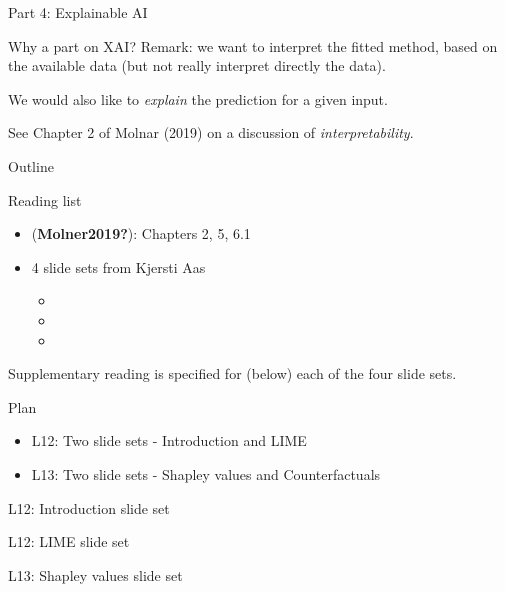 \documentclass[
  ignorenonframetext,
]{beamer}
\providecommand{\tightlist}{%
  \setlength{\itemsep}{0pt}\setlength{\parskip}{0pt}}
\begin{document}
\begin{frame}{Part 4: Explainable AI}
\begin{block}{Why a part on XAI?}
Remark: we want to interpret the fitted method, based on the available
data (but not really interpret directly the data).

We would also like to \emph{explain} the prediction for a given input.

See Chapter 2 of Molnar (2019) on a discussion of
\emph{interpretability}.
\end{block}

\begin{block}{Outline}
\protect\hypertarget{outline}{}
\end{block}

\begin{block}{Reading list}
\protect\hypertarget{reading-list}{}
\begin{itemize}
\tightlist
\item
  (\textbf{Molner2019?}): Chapters 2, 5, 6.1
\item
  4 slide sets from Kjersti Aas

  \begin{itemize}
  \tightlist
  \item
  \item
  \item
  \end{itemize}
\end{itemize}

Supplementary reading is specified for (below) each of the four slide
sets.
\end{block}

\begin{block}{Plan}
\protect\hypertarget{plan}{}
\begin{itemize}
\tightlist
\item
  L12: Two slide sets - Introduction and LIME
\item
  L13: Two slide sets - Shapley values and Counterfactuals
\end{itemize}
\end{block}
\end{frame}

\begin{frame}{L12: Introduction slide set}
\protect\hypertarget{l12-introduction-slide-set}{}
\end{frame}

\begin{frame}{L12: LIME slide set}
\protect\hypertarget{l12-lime-slide-set}{}
\end{frame}

\begin{frame}{L13: Shapley values slide set}
\protect\hypertarget{l13-shapley-values-slide-set}{}
\end{frame}
\end{document}
